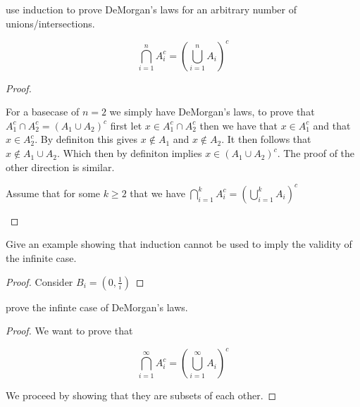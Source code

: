 \documentclass[11pt,largemargins]{homework}
\begin{document}
\begin{alphaparts}
    \questionpart
    use induction to prove DeMorgan's laws for an arbitrary number of unions/intersections. 

    \[\bigcap_{i =1}^n A_i^c = \left(\bigcup_{i = 1}^n A_i \right)^c \]

    \begin{proof}
        \begin{induction}
            \basecase 
            For a basecase of $n = 2$ we simply have DeMorgan's laws, to prove that $A_1^c \cap A_2^c = (A_1 \cup A_2)^c$
            first let $x \in A_1^c \cap A_2^c$ then we have that $x \in A_1^c $ and that $x \in A_2^c$. By definiton this gives 
            $x \notin A_1$ and $x \notin A_2$. It then follows that $x \notin A_1 \cup A_2$. Which then by definiton implies
            $x \in (A_1 \cup A_2)^c $. The proof of the other direction is similar. 
            
            \indhyp
            Assume that for some $k \geq 2$ that we have $\bigcap_{i =1}^k A_i^c = \left(\bigcup_{i = 1}^k A_i \right)^c $
            
            
        \end{induction}
    \end{proof}

    \questionpart
    Give an example showing that induction cannot be used to imply the validity of the infinite case.

    \begin{proof}
        Consider $B_i = (0, \frac{1}{i})$
    \end{proof}

    \questionpart
    prove the infinte case of DeMorgan's laws. 

    \begin{proof}
        We want to prove that 

        \[\bigcap_{i = 1}^{\infty} A_i^c = \left(\bigcup_{i = 1}^{\infty} A_i \right)^c \]

        We proceed by showing that they are subsets of each other. 
    \end{proof}
\end{alphaparts}
\end{document}
